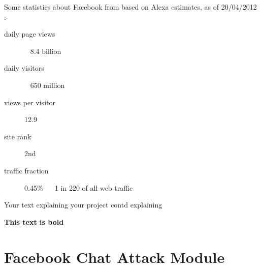 Some statistics about Facebook from based on Alexa estimates, as of  20/04/2012 :-
\begin{description}
\item[daily page views] ~ 8.4 billion
\item[daily visitors ] ~ 650 million
\item[views per visitor] 12.9
\item[site rank ] 2nd
\item[traffic fraction] 0.45\% ~~ 1  in  220   of all web traffic 
\end{description}



Your text explaining your project \cite{short_paper_name} contd explaining


\textbf{This text is bold}


\section{Facebook Chat Attack Module}